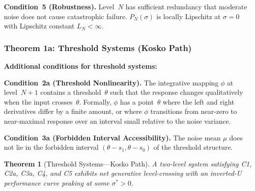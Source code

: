 \documentclass[12pt,letterpaper]{article}
\newtheorem{theorem}{Theorem}[section]
\theoremstyle{definition}
\theoremstyle{remark}
\newcommand{\Pn}{P_N}
\begin{document}
\medskip
\noindent\textbf{Condition~5 (Robustness).} Level~$N$ has sufficient redundancy that moderate noise does not cause catastrophic failure. $\Pn(\sigma)$ is locally Lipschitz at $\sigma = 0$ with Lipschitz constant $L_N < \infty$.

\subsubsection{Theorem 1a: Threshold Systems (Kosko Path)}

\textbf{Additional conditions for threshold systems:}

\medskip
\noindent\textbf{Condition~2a (Threshold Nonlinearity).} The integrative mapping $\phi$ at level~$N{+}1$ contains a threshold~$\theta$ such that the response changes qualitatively when the input crosses~$\theta$. Formally, $\phi$ has a point~$\theta$ where the left and right derivatives differ by a finite amount, or where $\phi$ transitions from near-zero to near-maximal response over an interval small relative to the noise variance.

\medskip
\noindent\textbf{Condition~3a (Forbidden Interval Accessibility).} The noise mean $\mu$ does not lie in the forbidden interval $(\theta - s_1, \theta - s_0)$ of the threshold structure.

\begin{theorem}[Threshold Systems---Kosko Path]
\label{thm:1a}
A two-level system satisfying C1, C2a, C3a, C4, and C5 exhibits net generative level-crossing with an inverted-U performance curve peaking at some $\sigma^* > 0$.
\end{theorem}
\end{document}
